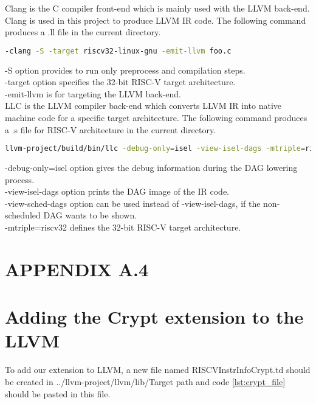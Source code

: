 Clang is the C compiler front-end which is mainly used with the LLVM back-end. Clang is used in this project to produce LLVM IR code. The following command produces a .ll file in the current directory. 

\begin{lstlisting}[language=Bash]
-clang -S -target riscv32-linux-gnu -emit-llvm foo.c
\end{lstlisting}

-S option provides to run only preprocess and compilation steps. \\
-target option specifies the 32-bit RISC-V target architecture. \\
-emit-llvm is for targeting the LLVM back-end. \\

LLC is the LLVM compiler back-end which converts LLVM IR into native machine code for a specific target architecture. The following command produces a .s file for RISC-V architecture in the current directory. 

\begin{lstlisting}[language=Bash]
llvm-project/build/bin/llc -debug-only=isel -view-isel-dags -mtriple=riscv32 lxr.ll
\end{lstlisting}

-debug-only=isel option gives the debug information during the DAG lowering process.\\
-view-isel-dags option prints the DAG image of the IR code.\\
-view-sched-dags option can be used instead of -view-isel-dags, if the non-scheduled DAG wants to be shown.\\
-mtriple=riscv32 defines the 32-bit RISC-V target architecture.\\
\newpage



\section*{APPENDIX A.4}
\renewcommand{\theequation}{A.2.\arabic{equation}}
\setcounter{equation}{0}
\section{Adding the Crypt extension to the LLVM}
To add our extension to LLVM, a new file named RISCVInstrInfoCrypt.td should be created in ../llvm-project/llvm/lib/Target path and code \ref{lst:crypt_file} should be pasted in this file.


